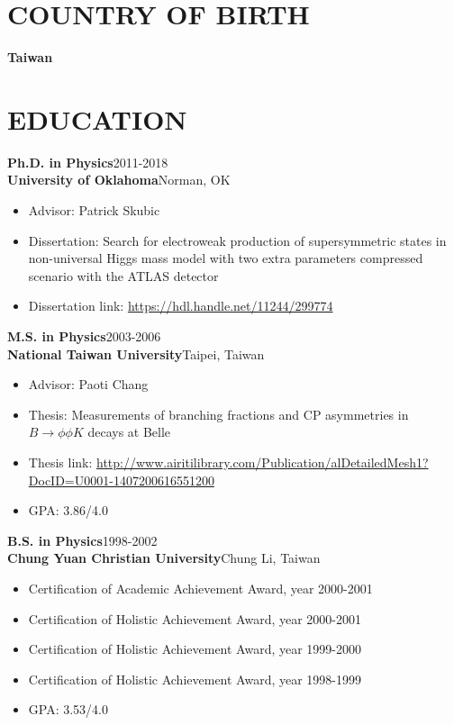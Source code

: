 \documentclass[margin, 10pt]{res} %
\begin{document}
\begin{resume}

\section{COUNTRY OF BIRTH}
\textbf{Taiwan}


\section{EDUCATION} 
\textbf{Ph.D. in Physics}\hfill{2011-2018}\\
\textbf{University of Oklahoma}\hfill{Norman, OK}\\
\begin{itemize}
    \item Advisor: Patrick Skubic
    \item Dissertation: Search for electroweak production of supersymmetric states in non-universal Higgs mass model with two extra parameters compressed scenario with the ATLAS detector
    \item Dissertation link: \url{https://hdl.handle.net/11244/299774}
\end{itemize}
\textbf{M.S. in Physics}\hfill{2003-2006}\\
\textbf{National Taiwan University}\hfill{Taipei, Taiwan}\\
\begin{itemize}
    \item Advisor: Paoti Chang
    \item Thesis: Measurements of branching fractions and CP asymmetries in $B \to \phi \phi K$ decays at Belle
    \item Thesis link: \url{http://www.airitilibrary.com/Publication/alDetailedMesh1?DocID=U0001-1407200616551200}
    \item GPA: 3.86/4.0
\end{itemize}
\textbf{B.S. in Physics}\hfill{1998-2002}\\
\textbf{Chung Yuan Christian University}\hfill{Chung Li, Taiwan}\\
\begin{itemize}
    \item Certification of Academic Achievement Award, year 2000-2001
    \item Certification of Holistic Achievement Award, year 2000-2001
    \item Certification of Holistic Achievement Award, year 1999-2000
    \item Certification of Holistic Achievement Award, year 1998-1999
    \item GPA: 3.53/4.0
\end{itemize}



\end{resume}
\end{document}
